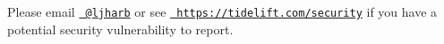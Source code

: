 Please email \href{https://github.com/ljharb}{\texttt{ @ljharb}} or see \href{https://tidelift.com/security}{\texttt{ https\+://tidelift.\+com/security}} if you have a potential security vulnerability to report. 